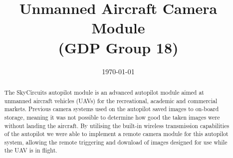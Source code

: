 \documentclass[oneside]{ecsgdp}         %
\begin{document}
\frontmatter
\title      {Unmanned Aircraft Camera Module \\(GDP Group 18)}
\date       {\today}
\subject    {ELEC6050 Group Design Project}
\maketitle
\begin{abstract}
The SkyCircuits autopilot module is an advanced autopilot module aimed at unmanned aircraft vehicles (UAVs) for the recreational, academic and commercial markets. Previous camera systems used on the autopilot saved images to on-board storage, meaning it was not possible to determine how good the taken images were without landing the aircraft. By utilising the built-in wireless transmission capabilities of the autopilot we were able to implement a remote camera module for this autopilot system, allowing the remote triggering and download of images designed for use while the UAV is in flight.

\end{abstract}
\tableofcontents
\listoffigures
\listoftables
\lstlistoflistings
\mainmatter



\newpage

\newpage

\newpage

\newpage

\newpage
%

\newpage
%

\newpage
%

\newpage

\newpage

\newpage
\end{document}
